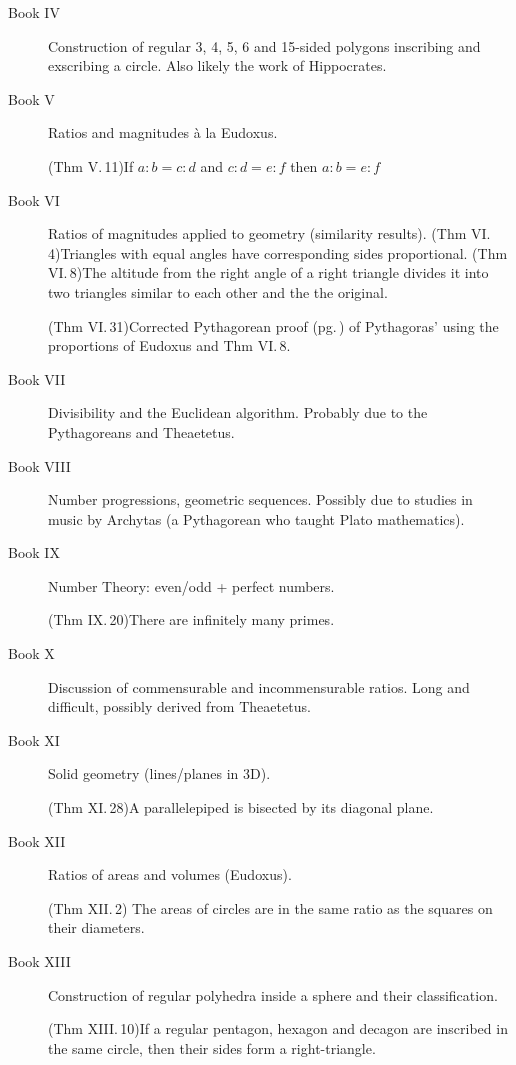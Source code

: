 \begin{description}
	\item[Book IV]\lstsp Construction of regular 3, 4, 5, 6 and 15-sided polygons inscribing and exscribing a circle. Also likely the work of Hippocrates.
	
	\item[Book V]\lstsp Ratios and magnitudes à la Eudoxus.\par
		(Thm V.\,11)\lstsp If $a:b=c:d$ and $c:d=e:f$ then $a:b=e:f$
	
	
	\item[Book VI]\lstsp Ratios of magnitudes applied to geometry (similarity results).\smallbreak
	  (Thm VI.\,4)\lstsp Triangles with equal angles have corresponding sides proportional.\smallbreak
	  (Thm VI.\,8)\lstsp The altitude from the right angle of a right triangle divides it into two triangles similar to each other and the the original.\par
	  (Thm VI.\,31)\lstsp Corrected Pythagorean proof (pg.\,\pageref{pthagorig}) of Pythagoras' using the proportions of Eudoxus and Thm VI.\,8.
	  
	
	\item[Book VII]\lstsp Divisibility and the Euclidean algorithm. Probably due to the Pythagoreans and Theaetetus.
	
	
	\item[Book VIII]\lstsp Number progressions, geometric sequences. Possibly due to studies in music by Archytas (a Pythagorean who taught Plato mathematics).
	
	
	\item[Book IX]\lstsp Number Theory: even/odd + perfect numbers.\par
	(Thm IX.\,20)\lstsp There are infinitely many primes.
	
	
	\item[Book X]\lstsp Discussion of commensurable and incommensurable ratios. Long and difficult, possibly derived from Theaetetus.
	
	
	\item[Book XI]\lstsp Solid geometry (lines/planes in 3D).\par
		(Thm XI.\,28)\lstsp A parallelepiped is bisected by its diagonal plane.
		
		
	\item[Book XII]\lstsp Ratios of areas and volumes (Eudoxus).\par
		(Thm XII.\,2) The areas of circles are in the same ratio as the squares on their diameters.
	
	
	\item[Book XIII]\lstsp Construction of regular polyhedra inside a sphere and their classification.\par
		(Thm XIII.\,10)\lstsp If a regular pentagon, hexagon and decagon are inscribed in the same circle, then their sides form a right-triangle.
\end{description}



